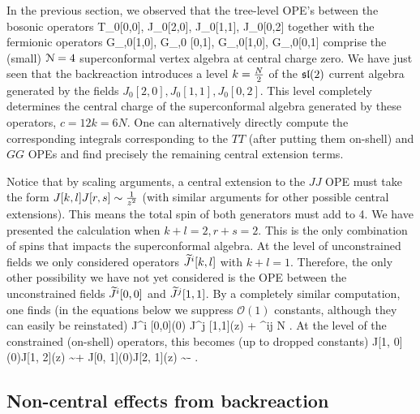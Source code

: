 \documentclass[../main.tex]{subfiles}
\begin{document}
In the previous section, we observed that the tree-level OPE's between the bosonic operators 
\beqn
T_0[0,0], J_0[2,0], J_0[1,1], J_0[0,2]
\eeqn
together with the fermionic operators
\beqn
G_{\alpha,0}[1,0], G_{\alpha,0} [0,1], G_{\gamma,0}[1,0], G_{\gamma,0}[0,1]
\eeqn
comprise the (small) $\mathcal{N}=4$ superconformal vertex algebra at central charge zero.
We have just seen that the backreaction introduces a level $k = {N \over 2}$ of the $\mathfrak{sl}(2)$ current algebra generated by the fields $J_0[2,0], J_0[1,1], J_0[0,2]$.
This level completely determines the central charge of the superconformal algebra generated by these operators, $c = 12 k = 6 N$.
One can alternatively directly compute the corresponding integrals corresponding to the $TT$ (after putting them on-shell) and $GG$ OPEs and find precisely the remaining central extension terms.


Notice that by scaling arguments, a central extension to the $JJ$ OPE must take the form $J[k, l]J[r, s] \sim {1 \over z^2}$ (with similar arguments for other possible central extensions). This means the total spin of both generators must add to 4. 
We have presented the calculation when $k + l =2, r + s =2$. 
This is the only combination of spins that impacts the superconformal algebra. 
At the level of unconstrained fields we only considered operators $\widetilde J^i [k,l]$ with $k+l = 1$.
Therefore, the only other possibility we have not yet considered is the OPE between the unconstrained fields $\widetilde J^i [0,0]$ and $\widetilde J^j [1,1]$.
By a completely similar computation, one finds (in the equations below we suppress $\mathcal{O}(1)$ constants, although they can easily be reinstated)
\beqn
\til J^i [0,0](0) \til J^j [1,1](z) \simeq \cdots + \eps^{ij}  N .
\eeqn
At the level of the constrained (on-shell) operators, this becomes (up to dropped constants)
\beqn
J[1, 0](0)J[1, 2](z) \sim \cdots + 
\eeqn
\beqn
J[0, 1](0)J[2, 1](z) \sim \cdots - .
\eeqn

\subsection{Non-central effects from backreaction}
\end{document}
